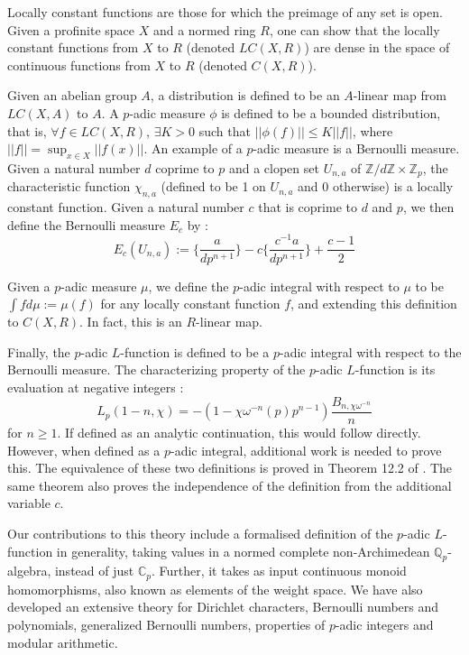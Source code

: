 \documentclass[a4paper,UKenglish,cleveref, autoref, thm-restate]{lipics-v2021}
\begin{document}
Locally constant functions are those for which the preimage of any set is open. Given a profinite space $X$ and a normed ring $R$, 
one can show that the locally constant functions from $X$ to $R$ (denoted $LC(X, R)$) are dense in the space of continuous 
functions from $X$ to $R$ (denoted $C(X, R)$). 

Given an abelian group $A$, a distribution is defined to be an $A$-linear map from $LC(X, A)$ 
to $A$. A $p$-adic measure $\phi$ is defined to be a bounded distribution, that is, $\forall f \in LC(X, R)$, 
$\exists K > 0$ such that $|| \phi (f) || \le K ||f|| $, where $||f|| = \sup_{x \in X} || f(x)||$. 
An example of a $p$-adic measure is a Bernoulli measure. Given a natural number $d$ coprime to $p$ and a clopen set $U_{n, a}$ of 
$\mathbb{Z}/ d \mathbb{Z} \times \mathbb{Z}_p$, the characteristic function $\chi_{n, a}$ 
(defined to be 1 on $U_{n, a}$ and 0 otherwise) is a locally constant function. 
Given a natural number $c$ that is coprime to $d$ and $p$, we then define the Bernoulli measure $E_c$ by :
$$ E_c(U_{n, a}) := \bigg \{ \frac{a}{d p^{n + 1}} \bigg \} - c \bigg \{ \frac{c^{-1} a}{d p^{n + 1}} \bigg \} + \frac{c - 1}{2} $$

Given a $p$-adic measure $\mu$, we define the $p$-adic integral with respect 
to $\mu$ to be $\int f d\mu := \mu (f)$ for any locally constant function $f$, and 
extending this definition to $C(X, R)$. In fact, this is an $R$-linear map. 

Finally, the $p$-adic $L$-function is defined to be a $p$-adic integral with respect to the Bernoulli 
measure. The characterizing property of the $p$-adic $L$-function is its evaluation at negative integers : 
$$ L_p (1 - n, \chi) = -(1 - \chi \omega^{-n}(p)p^{n - 1}) \frac{B_{n, \chi \omega^{-n}}}{n} $$
for $n \ge 1$. If defined as an analytic continuation, this would follow directly. However, when 
defined as a $p$-adic integral, additional work is needed to prove this. The equivalence of these two definitions 
is proved in Theorem 12.2 of \cite{cyc}. The same theorem 
also proves the independence of the definition from the additional variable $c$.

Our contributions to this theory include a formalised definition of the $p$-adic $L$-function in generality, 
taking values in a normed complete non-Archimedean $\mathbb{Q}_p$-algebra, instead of just $\mathbb{C}_p$. Further, it takes as 
input continuous monoid homomorphisms, also known as elements of the weight space. We have also developed an extensive theory for 
Dirichlet characters, Bernoulli numbers and polynomials, generalized Bernoulli numbers, properties of $p$-adic integers and modular arithmetic.
\end{document}
